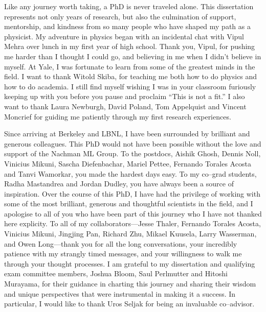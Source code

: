 \begin{acknowledgements}

    Like any journey worth taking, a PhD is never traveled alone.
    This dissertation represents not only years of research, but also the culmination of support, mentorship, and kindness from so many people who have shaped my path as a physicist.
    My adventure in physics began with an incidental chat with Vipul Mehra over lunch in my first year of high school.
    Thank you, Vipul, for pushing me harder than I thought I could go, and believing in me when I didn't believe in myself.
    At Yale, I was fortunate to learn from some of the greatest minds in the field.
    I want to thank Witold Skiba, for teaching me both how to do physics and how to do academia.
    I still find myself wishing I was in your classroom furiously keeping up with you before you pause and proclaim ``This is not a fit.''
    I also want to thank Laura Newburgh, David Poland, Tom Appelquist and Vincent Moncrief for guiding me patiently through my first research experiences.
    
    Since arriving at Berkeley and LBNL, I have been surrounded by brilliant and generous colleagues.
    This PhD would not have been possible without the love and support of the Nachman ML Group.
    To the postdocs, Aishik Ghosh, Dennis Noll, Vinicius Mikuni, Sascha Diefenbachar, Mariel Pettee, Fernando Torales Acosta and Tanvi Wamorkar, you made the hardest days easy.
    To my co--grad students, Radha Mastandrea and Jordan Dudley, you have always been a source of inspiration.
    Over the course of this PhD, I have had the privilege of working with some of the most brilliant, generous and thoughtful scientists in the field, and I apologise to all of you who have been part of this journey who I have not thanked here explicity.
    To all of my collaborators---Jesse Thaler, Fernando Torales Acosta, Vinicius Mikuni, Jingjing Pan, Richard Zhu, Mikael Kuusela, Larry Wasserman, and Owen Long---thank you for all the long conversations, your incredibly patience with my strangly timed messages, and your willingness to walk me through your thought processes.
    I am grateful to my dissertation and qualifying exam committee members, Joshua Bloom, Saul Perlmutter and Hitoshi Murayama, for their guidance in charting this journey and sharing their wisdom and unique perspectives that were instrumental in making it a success. In particular, I would like to thank Uros Seljak for being an invaluable co--advisor.


\end{acknowledgements}
